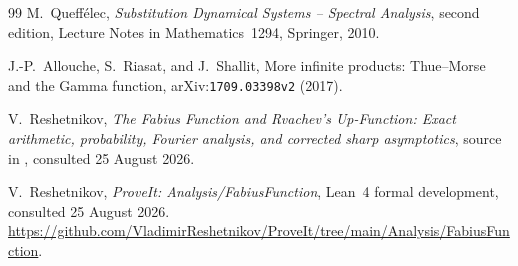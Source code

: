 \documentclass[11pt,oneside]{article}
\theoremstyle{definition}
\theoremstyle{remark}
\begin{document}
\begin{thebibliography}{99}
M.~Queff\'elec,
\newblock \emph{Substitution Dynamical Systems -- Spectral Analysis},
\newblock second edition, Lecture Notes in Mathematics~1294, Springer, 2010.

J.-P.~Allouche, S.~Riasat, and J.~Shallit,
\newblock More infinite products: Thue--Morse and the Gamma function,
\newblock arXiv:\nolinkurl{1709.03398v2} (2017).

V.~Reshetnikov,
\newblock \emph{The Fabius Function and Rvachev's Up-Function: Exact
  arithmetic, probability, Fourier analysis, and corrected sharp
  asymptotics},
\newblock source in ,
  consulted 25 August 2026.

V.~Reshetnikov,
\newblock \emph{ProveIt: Analysis/FabiusFunction},
\newblock Lean~4 formal development, consulted 25 August 2026.
\newblock \url{https://github.com/VladimirReshetnikov/ProveIt/tree/main/Analysis/FabiusFunction}.

\end{thebibliography}
\end{document}
